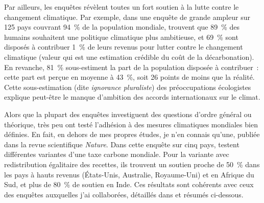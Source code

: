 \documentclass[a5paper,french,openany]{memoir}
\begin{document}
Par ailleurs, les enquêtes révèlent toutes un fort soutien à la lutte contre le changement climatique. Par exemple, dans une enquête de grande ampleur sur 125 pays couvrant 94~\% de la population mondiale, \citet{andre_globally_2024} trouvent que 89~\% des humains souhaitent une politique climatique plus ambitieuse, et 69~\% sont disposés à contribuer 1~\% de leurs revenus pour lutter contre le changement climatique (valeur qui est une estimation crédible du coût de la décarbonation). 
En revanche, 81~\% sous-estiment la part de la population disposée à contribuer~: %
cette part est perçue en moyenne à 43~\%, soit 26 points de moins que la réalité. Cette sous-estimation (dite \textit{ignorance pluraliste}) des préoccupations écologistes explique peut-être le manque d'ambition des accords internationaux sur le climat. %

Alors que la plupart des enquêtes investiguent des questions d'ordre général ou théorique, très peu ont testé l'adhésion à des mesures climatiques mondiales bien définies. En fait, en dehors de mes propres études, je n'en connais qu'une, publiée dans la revue scientifique \textit{Nature}. Dans cette enquête sur cinq pays, \citet{carattini_how_2019} testent différentes variantes d'une taxe carbone mondiale. Pour la variante avec redistribution égalitaire des recettes, ils trouvent un soutien proche de 50~\% dans les pays à hauts revenus (États-Unis, Australie, Royaume-Uni) et en Afrique du Sud, et plus de 80~\% de soutien en Inde. Ces résultats sont cohérents avec ceux des enquêtes auxquelles j'ai collaborées, détaillés dans \citet{fabre_international_2023} et résumés ci-dessous. 
\end{document}
